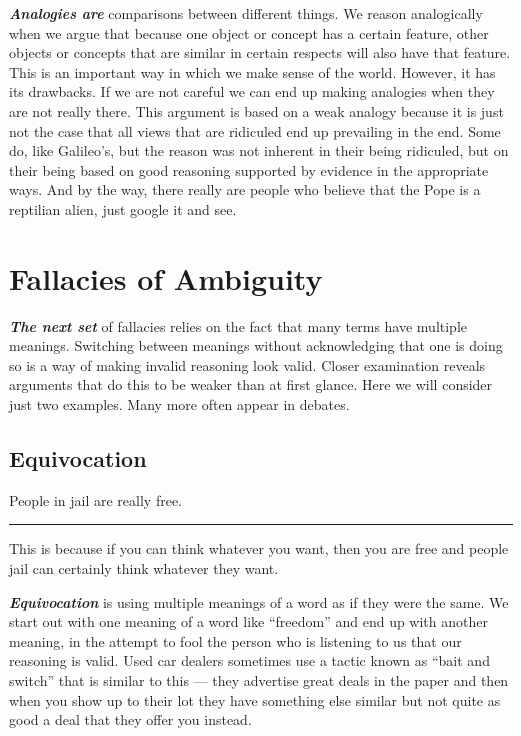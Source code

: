 \documentclass[]{book}
\makeatletter
\newenvironment{kframe}{%
\medskip{}
\setlength{\fboxsep}{.8em}
 \def\at@end@of@kframe{}%
 \ifinner\ifhmode%
  \def\at@end@of@kframe{\end{minipage}}%
  \begin{minipage}{\columnwidth}%
 \fi\fi%
 \def\FrameCommand##1{\hskip\@totalleftmargin \hskip-\fboxsep
 \colorbox{shadecolor}{##1}\hskip-\fboxsep
     \hskip-\linewidth \hskip-\@totalleftmargin \hskip\columnwidth}%
 \MakeFramed {\advance\hsize-\width
   \@totalleftmargin\z@ \linewidth\hsize
   \@setminipage}}%
 {\par\unskip\endMakeFramed%
 \at@end@of@kframe}
\newenvironment{rmdblock}[1]
  {
  \begin{itemize}
  \renewcommand{\labelitemi}{
    \raisebox{-.7\height}[0pt][0pt]{
      {\setkeys{Gin}{width=3em,keepaspectratio}\texttt{[image: img/\#1]}}
    }
  }
  \setlength{\fboxsep}{1em}
  \begin{kframe}
  \item
  }
  {
  \end{kframe}
  \end{itemize}
  }
\newenvironment{rmdwarning}
  {\begin{rmdblock}{warning}}
  {\end{rmdblock}}
\makeatother
\begin{document}
\textbf{\emph{Analogies are}} comparisons between different things. We reason analogically when we argue that because one object or concept has a certain feature, other objects or concepts that are similar in certain respects will also have that feature. This is an important way in which we make sense of the world. However, it has its drawbacks. If we are not careful we can end up making analogies when they are not really there. This argument is based on a weak analogy because it is just not the case that all views that are ridiculed end up prevailing in the end. Some do, like Galileo's, but the reason was not inherent in their being ridiculed, but on their being based on good reasoning supported by evidence in the appropriate ways. And by the way, there really are people who believe that the Pope is a reptilian alien, just google it and see.

\hypertarget{fallacies-of-ambiguity}{%
\section{Fallacies of Ambiguity}\label{fallacies-of-ambiguity}}

\textbf{\emph{The next set}} of fallacies relies on the fact that many terms have multiple meanings. Switching between meanings without acknowledging that one is doing so is a way of making invalid reasoning look valid. Closer examination reveals arguments that do this to be weaker than at first glance. Here we will consider just two examples. Many more often appear in debates.

\hypertarget{equivocation}{%
\subsection*{Equivocation}\label{equivocation}}


\begin{rmdwarning}
People in jail are really free.

\begin{center}\rule{0.5\linewidth}{\linethickness}\end{center}

This is because if you can think whatever you want, then you are free
and people jail can certainly think whatever they want.
\end{rmdwarning}

\textbf{\emph{Equivocation}} is using multiple meanings of a word as if they were the same. We start out with one meaning of a word like ``freedom'' and end up with another meaning, in the attempt to fool the person who is listening to us that our reasoning is valid. Used car dealers sometimes use a tactic known as ``bait and switch'' that is similar to this --- they advertise great deals in the paper and then when you show up to their lot they have something else similar but not quite as good a deal that they offer you instead.
\end{document}
